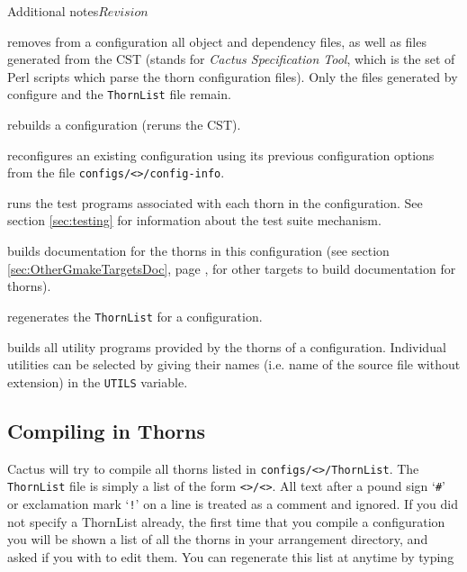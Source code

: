 \begin{cactuspart}{Additional notes}{}{$Revision$}
\begin{Lentry}
\item [\texttt{gmake <\var{config}>-realclean}] removes from a configuration
all object and dependency files, as well as files generated from the
CST (stands for \textit{Cactus Specification Tool}, which is the set of Perl scripts
which parse the thorn configuration files).  Only the files generated
by configure and the \texttt{ThornList} file remain.

\item [\texttt{gmake <\var{config}>-rebuild}] rebuilds a configuration (reruns the CST).

\item [\texttt{gmake <\var{config}>-reconfig}] reconfigures an existing
configuration using its previous configuration options from the file
\texttt{configs/<>/config-info}.

\item [\texttt{gmake <\var{config}>-testsuite}] runs the test programs
associated with each thorn in the configuration. See section
\ref{sec:testing} for information about the test suite mechanism.

\item[\texttt{gmake <\var{config}>-ThornGuide}] builds documentation for the
thorns in this configuration
  (see section \ref{sec:OtherGmakeTargetsDoc}, page
  \pageref{sec:OtherGmakeTargetsDoc}, for other targets to build documentation
  for thorns).

\item [\texttt{gmake <\var{config}>-thornlist}] regenerates the
\texttt{ThornList} for a configuration.

\item [\texttt{gmake <\var{config}>-utils [UTILS$=$<\var{list}>]}] builds all
utility programs provided by the thorns of a configuration. Individual
utilities can be selected by giving their names (i.e. name of the source file without extension) in the \texttt{UTILS} variable.

\end{Lentry}



\subsection{Compiling in Thorns}
\label{sec:cointh}

Cactus will try to compile all thorns listed in
\texttt{configs/<>/ThornList}.
The \texttt{ThornList} file is simply a list of the form
\texttt{<>/<>}.  All text after a pound sign
`\texttt{\#}' or exclamation mark `\texttt{!}'
on a line is treated as a comment and ignored.
If you did
not specify a ThornList already, the first time that you compile a configuration
you will be shown a list of all the thorns in your arrangement
directory, and asked if you with to edit them. You can regenerate
this list at anytime by typing


\end{cactuspart}
